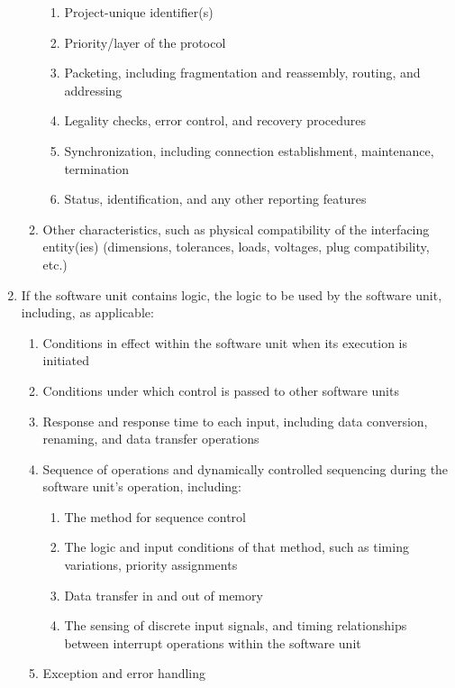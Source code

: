 \documentclass{fidata-report-template}
\begin{document}
\begin{enumerate}
\begin{enumerate}
    \begin{enumerate}
    \itemsep1pt\parskip0pt
    \item
      Project-unique identifier(s)
    \item
      Priority/layer of the protocol
    \item
      Packeting, including fragmentation and reassembly, routing, and
      addressing
    \item
      Legality checks, error control, and recovery procedures
    \item
      Synchronization, including connection establishment, maintenance,
      termination
    \item
      Status, identification, and any other reporting features
    \end{enumerate}
  \item
    Other characteristics, such as physical compatibility of the
    interfacing entity(ies) (dimensions, tolerances, loads, voltages,
    plug compatibility, etc.)
  \end{enumerate}
\item
  If the software unit contains logic, the logic to be used by the
  software unit, including, as applicable:

  \begin{enumerate}
  \itemsep1pt\parskip0pt
  \item
    Conditions in effect within the software unit when its execution is
    initiated
  \item
    Conditions under which control is passed to other software units
  \item
    Response and response time to each input, including data conversion,
    renaming, and data transfer operations
  \item
    Sequence of operations and dynamically controlled sequencing during
    the software unit's operation, including:

    \begin{enumerate}
    \itemsep1pt\parskip0pt
    \item
      The method for sequence control
    \item
      The logic and input conditions of that method, such as timing
      variations, priority assignments
    \item
      Data transfer in and out of memory
    \item
      The sensing of discrete input signals, and timing relationships
      between interrupt operations within the software unit
    \end{enumerate}
  \item
    Exception and error handling
  \end{enumerate}
\end{enumerate}
\end{document}
